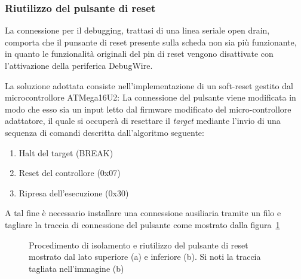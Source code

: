 \subsubsection{Riutilizzo del pulsante di reset}

La connessione per il debugging, trattasi di una linea seriale open drain, comporta che il punsante di reset presente sulla scheda non sia più funzionante, in quanto le funzionalità originali del pin di reset vengono disattivate con l'attivazione della periferica DebugWire.

La soluzione adottata consiste nell'implementazione di un soft-reset gestito dal microcontrollore ATMega16U2: La connessione del pulsante viene modificata in modo che esso sia un input letto dal firmware modificato del micro-controllore adattatore, il quale si occuperà di resettare il \textit{target} mediante l'invio di una sequenza di comandi descritta dall'algoritmo seguente:
\begin{enumerate}
    \item Halt del target (BREAK)
    \item Reset del controllore (0x07)
    \item Ripresa dell'esecuzione (0x30)
\end{enumerate}

A tal fine è necessario installare una connessione ausiliaria tramite un filo e tagliare la traccia di connessione del pulsante come mostrato dalla figura~\ref{fig:rst-rewire}

\begin{figure}[h]
    \centering
    \hspace{8mm}

    \caption[]{Procedimento di isolamento e riutilizzo del pulsante di reset mostrato dal lato superiore (a) e inferiore (b). Si noti la traccia tagliata nell'immagine (b)}\label{fig:rst-rewire}
\end{figure}

